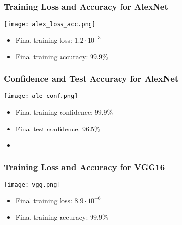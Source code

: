 \documentclass[../presentation.tex]{subfiles} %
\begin{document}


\begin{frame}
    \frametitle{Training Loss and Accuracy for AlexNet}
    \begin{center}
        \texttt{[image: alex\_loss\_acc.png]}
    \end{center}

    \small{
    \begin{cbox}
        \begin{itemize}
            \item Final training loss: $1.2\cdot 10^{-3}$
            \item Final training accuracy: $99.9\%$
        \end{itemize}
    \end{cbox}
    }
\end{frame}

\begin{frame}
    \frametitle{Confidence and Test Accuracy for AlexNet}
    \begin{center}
        \texttt{[image: ale\_conf.png]}
    \end{center}

    \small{
    \begin{cbox}
        \begin{itemize}
            \item Final training confidence: $99.9\%$
            \item Final test confidence: $96.5\%$
            \item {}
        \end{itemize}
    \end{cbox}
    }
\end{frame}

\begin{frame}
    \frametitle{Training Loss and Accuracy for VGG16}
    \begin{center}
        \texttt{[image: vgg.png]}
    \end{center}

    \small{
    \begin{cbox}
        \begin{itemize}
            \item Final training loss: $8.9\cdot 10^{-6}$
            \item Final training accuracy: $99.9\%$
        \end{itemize}
    \end{cbox}
    }
\end{frame}
\end{document}
